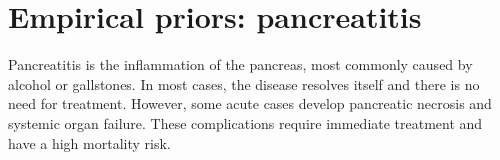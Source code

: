 \chapter{Empirical priors: pancreatitis}
\label{applications-priors_empirical}

Pancreatitis is the inflammation of the pancreas, most commonly caused by alcohol or gallstones.  In most cases, the disease resolves itself and there is no need for treatment.  However, some acute cases develop pancreatic necrosis and systemic organ failure.  These complications require immediate treatment and have a high mortality risk. \cite{raraty_acute_2004, banks_epidemiology_2002, sekimoto_JPN_2006}

